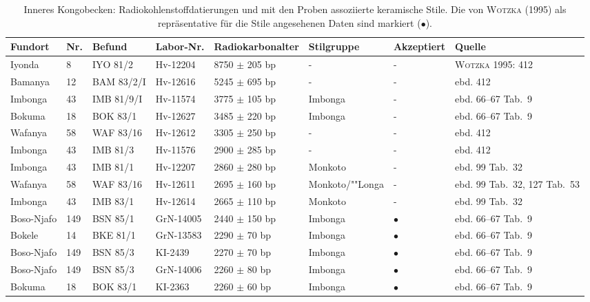 \begin{footnotesize}
{\sffamily
\begin{longtable}{@{}P{.075\textwidth}P{.025\textwidth}P{.105\textwidth}P{.1\textwidth}P{.15\textwidth}P{.1\textwidth}P{.1\textwidth}P{.15\textwidth}@{}}
\toprule
\textbf{Fundort} & \textbf{Nr.} & \textbf{Befund} & \textbf{Labor-Nr.} & \textbf{Radiokarbonalter} & \textbf{Stilgruppe} & \textbf{Akzeptiert} & \textbf{Quelle} \\
\midrule
\endhead
\bottomrule
\caption{Inneres Kongobecken: Radiokohlenstoffdatierungen und mit den Proben assoziierte keramische Stile. Die von \textsc{Wotzka} (1995) als repräsentative für die Stile angesehenen Daten sind markiert ($\bullet$).}
\label{tab:Wotzka1995-412_14C_Repr}
\endfoot
 Iyonda & 8 & IYO 81/2 & Hv-12204 & 8750 \( \pm \) 205 bp & - & - & \textsc{Wotzka} 1995: 412 \\
 Bamanya & 12 & BAM 83/2/I & Hv-12616 & 5245 \( \pm \) 695 bp & - & - & ebd. 412 \\
 Imbonga & 43 & IMB 81/9/I & Hv-11574 & 3775 \( \pm \) 105 bp & Imbonga & - & ebd. 66--67 Tab.~9 \\
 Bokuma & 18 & BOK 83/1 & Hv-12627 & 3485 \( \pm \) 220 bp & Imbonga & - & ebd. 66--67 Tab.~9 \\
 Wafanya & 58 & WAF 83/16 & Hv-12612 & 3305 \( \pm \) 250 bp & - & - & ebd. 412 \\
 Imbonga & 43 & IMB 81/3 & Hv-11576 & 2900 \( \pm \) 285 bp & - & - & ebd. 412 \\
 Imbonga & 43 & IMB 81/1 & Hv-12207 & 2860 \( \pm \) 280 bp & Monkoto & - & ebd. 99 Tab.~32 \\
 Wafanya & 58 & WAF 83/16 & Hv-12611 & 2695 \( \pm \) 160 bp & Monkoto/""Longa & - & ebd. 99 Tab.~32, 127 Tab.~53 \\
 Imbonga & 43 & IMB 83/1 & Hv-12614 & 2665 \( \pm \) 110 bp & Monkoto & - & ebd. 99 Tab.~32 \\
 Boso-Njafo & 149 & BSN 85/1 & GrN-14005 & 2440 \( \pm \) 150 bp & Imbonga & $\bullet $ & ebd. 66--67 Tab.~9 \\
 Bokele & 14 & BKE 81/1 & GrN-13583 & 2290 \( \pm \) 70 bp & Imbonga & $\bullet $ & ebd. 66--67 Tab.~9 \\
 Boso-Njafo & 149 & BSN 85/3 & KI-2439 & 2270 \( \pm \) 70 bp & Imbonga & $\bullet $ & ebd. 66--67 Tab.~9 \\
 Boso-Njafo & 149 & BSN 85/3 & GrN-14006 & 2260 \( \pm \) 80 bp & Imbonga & $\bullet $ & ebd. 66--67 Tab.~9 \\
 Bokuma & 18 & BOK 83/1 & KI-2363 & 2260 \( \pm \) 60 bp & Imbonga & $\bullet $ & ebd. 66--67 Tab.~9 \\

\end{longtable}}
\end{footnotesize}
